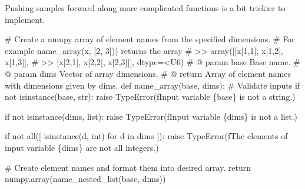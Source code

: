 \documentclass[
  letterpaper,
  DIV=11,
  numbers=noendperiod]{scrartcl}
\newenvironment{Shaded}{\begin{snugshade}}{\end{snugshade}}
\newcommand{\BuiltInTok}[1]{\textcolor[rgb]{0.00,0.23,0.31}{#1}}
\newcommand{\CommentTok}[1]{\textcolor[rgb]{0.37,0.37,0.37}{#1}}
\newcommand{\ControlFlowTok}[1]{\textcolor[rgb]{0.00,0.23,0.31}{#1}}
\newcommand{\KeywordTok}[1]{\textcolor[rgb]{0.00,0.23,0.31}{#1}}
\newcommand{\NormalTok}[1]{\textcolor[rgb]{0.00,0.23,0.31}{#1}}
\newcommand{\PreprocessorTok}[1]{\textcolor[rgb]{0.68,0.00,0.00}{#1}}
\newcommand{\SpecialCharTok}[1]{\textcolor[rgb]{0.37,0.37,0.37}{#1}}
\newcommand{\SpecialStringTok}[1]{\textcolor[rgb]{0.13,0.47,0.30}{#1}}
\newcommand{\StringTok}[1]{\textcolor[rgb]{0.13,0.47,0.30}{#1}}
\begin{document}
Pushing samples forward along more complicated functions is a bit
trickier to implement.

\begin{Shaded}
\begin{Highlighting}[]
\CommentTok{\# Create a numpy array of element names from the specified dimensions.}
\CommentTok{\# For example \textasciigrave{}name\_array(\textquotesingle{}x\textquotesingle{}, [2, 3]))\textasciigrave{} returns the array}
\CommentTok{\# \textgreater{}\textgreater{} array([[\textquotesingle{}x[1,1]\textquotesingle{}, \textquotesingle{}x[1,2]\textquotesingle{}, \textquotesingle{}x[1,3]\textquotesingle{}],}
\CommentTok{\# \textgreater{}\textgreater{}        [\textquotesingle{}x[2,1]\textquotesingle{}, \textquotesingle{}x[2,2]\textquotesingle{}, \textquotesingle{}x[2,3]\textquotesingle{}]], dtype=\textquotesingle{}\textless{}U6\textquotesingle{})}
\CommentTok{\# @ param base Base name.}
\CommentTok{\# @ param dims Vector of array dimensions.}
\CommentTok{\# @ return Array of element names with dimensions given by dims.}
\KeywordTok{def}\NormalTok{ name\_array(base, dims):}
  \CommentTok{\# Validate inputs}
  \ControlFlowTok{if} \KeywordTok{not} \BuiltInTok{isinstance}\NormalTok{(base, }\BuiltInTok{str}\NormalTok{):}
    \ControlFlowTok{raise} \PreprocessorTok{TypeError}\NormalTok{(}\SpecialStringTok{f\textquotesingle{}Input variable }\SpecialCharTok{\{}\NormalTok{base}\SpecialCharTok{\}}\SpecialStringTok{ is not a string.\textquotesingle{}}\NormalTok{)}

  \ControlFlowTok{if} \KeywordTok{not} \BuiltInTok{isinstance}\NormalTok{(dims, }\BuiltInTok{list}\NormalTok{):}
    \ControlFlowTok{raise} \PreprocessorTok{TypeError}\NormalTok{(}\SpecialStringTok{f\textquotesingle{}Input variable }\SpecialCharTok{\{}\NormalTok{dims}\SpecialCharTok{\}}\SpecialStringTok{ is not a list.\textquotesingle{}}\NormalTok{)}

  \ControlFlowTok{if} \KeywordTok{not} \BuiltInTok{all}\NormalTok{([ }\BuiltInTok{isinstance}\NormalTok{(d, }\BuiltInTok{int}\NormalTok{) }\ControlFlowTok{for}\NormalTok{ d }\KeywordTok{in}\NormalTok{ dims ]):}
    \ControlFlowTok{raise} \PreprocessorTok{TypeError}\NormalTok{(}\SpecialStringTok{f\textquotesingle{}The elements of input variable }\SpecialCharTok{\{}\NormalTok{dims}\SpecialCharTok{\}}\SpecialStringTok{ \textquotesingle{}}
                      \StringTok{\textquotesingle{}are not all integers.\textquotesingle{}}\NormalTok{)}

  \CommentTok{\# Create element names and format them into desired array.}
  \ControlFlowTok{return}\NormalTok{ numpy.array(name\_nested\_list(base, dims))}
\end{Highlighting}
\end{Shaded}
\end{document}
